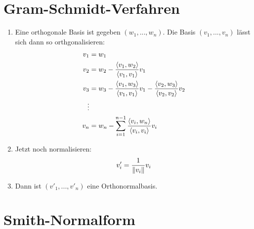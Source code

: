 \documentclass[ngerman,a4paper]{article}
\begin{document}
\section{Gram-Schmidt-Verfahren}
\begin{enumerate}[label=\textbf{\arabic*.}]
	\item Eine orthogonale Basis ist gegeben $(w_1,...,w_n)$. Die Basis $(v_1,...,v_n)$ lässt sich dann so orthgonalisieren:
	\begin{align}
		v_1 &= w_1 \notag \\
		v_2 &= w_2 - \frac{\langle v_1,w_2 \rangle}{\langle v_1,v_1 \rangle}v_1 \notag \\
		v_3 &= w_3 - \frac{\langle v_1,w_3\rangle}{\langle v_1,v_1\rangle}v_1 - \frac{\langle v_2,w_3\rangle}{\langle v_2,v_2\rangle}v_2 \notag \\
		\vdots \notag \\
		v_n &= w_n - \sum_{i=1}^{n-1} \frac{\langle v_i,w_n\rangle}{\langle v_i,v_i\rangle}v_i\notag
	\end{align}
	\item Jetzt noch normalisieren:
	\begin{align}
		v'_i = \frac{1}{\Vert v_i\Vert}v_i\notag
	\end{align}
	\item Dann ist $(v'_1,...,v'_n)$ eine Orthonormalbasis.
\end{enumerate}

\section{Smith-Normalform}
\end{document}
